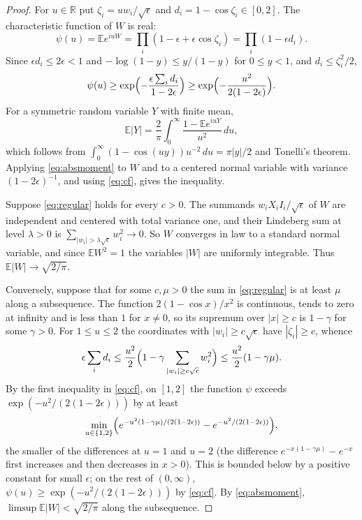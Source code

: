 \documentclass[11pt]{amsart}
\theoremstyle{remark}
\numberwithin{equation}{section}
\newcommand{\EE}{\mathbb{E}}
\newcommand{\R}{\mathbb{R}}
\begin{document}
\begin{proof}
For $u\in\R$ put $\zeta_i=uw_i/\sqrt\epsilon$ and $d_i=1-\cos \zeta_i\in[0,2]$. The characteristic function of $W$ is real:
\[
\psi(u)=\EE e^{iuW}=\prod_i(1-\epsilon+\epsilon\cos \zeta_i)=\prod_i(1-\epsilon d_i).
\]
Since $\epsilon d_i\le2\epsilon<1$ and $-\log(1-y)\le y/(1-y)$ for $0\le y<1$, and $d_i\le \zeta_i^2/2$,
\begin{equation}\label{eq:cf}
\psi(u)\ge\exp\Bigl(-\frac{\epsilon\sum_id_i}{1-2\epsilon}\Bigr)\ge\exp\Bigl(-\frac{u^2}{2(1-2\epsilon)}\Bigr).
\end{equation}
For a symmetric random variable $Y$ with finite mean,
\begin{equation}\label{eq:absmoment}
\EE|Y|=\frac2\pi\int_0^\infty\frac{1-\EE e^{iuY}}{u^2}\,du,
\end{equation}
which follows from $\int_0^\infty(1-\cos(uy))u^{-2}\,du=\pi|y|/2$ and Tonelli's theorem. Applying \eqref{eq:absmoment} to $W$ and to a centered normal variable with variance $(1-2\epsilon)^{-1}$, and using \eqref{eq:cf}, gives the inequality.

Suppose \eqref{eq:regular} holds for every $c>0$. The summands $w_iX_iI_i/\sqrt\epsilon$ of $W$ are independent and centered with total variance one, and their Lindeberg sum at level $\lambda>0$ is $\sum_{|w_i|>\lambda\sqrt\epsilon}w_i^2\to0$. So $W$ converges in law to a standard normal variable, and since $\EE W^2=1$ the variables $|W|$ are uniformly integrable. Thus $\EE|W|\to\sqrt{2/\pi}$.

Conversely, suppose that for some $c,\mu>0$ the sum in \eqref{eq:regular} is at least $\mu$ along a subsequence. The function $2(1-\cos x)/x^2$ is continuous, tends to zero at infinity and is less than $1$ for $x\ne0$, so its supremum over $|x|\ge c$ is $1-\gamma$ for some $\gamma>0$. For $1\le u\le2$ the coordinates with $|w_i|\ge c\sqrt\epsilon$ have $|\zeta_i|\ge c$, whence
\[
\epsilon\sum_id_i\le\frac{u^2}2\Bigl(1-\gamma\sum_{|w_i|\ge c\sqrt\epsilon}w_i^2\Bigr)\le\frac{u^2}{2}(1-\gamma\mu).
\]
By the first inequality in \eqref{eq:cf}, on $[1,2]$ the function $\psi$ exceeds $\exp(-u^2/(2(1-2\epsilon)))$ by at least
\[
\min_{u\in\{1,2\}}\Bigl(e^{-u^2(1-\gamma\mu)/(2(1-2\epsilon))}-e^{-u^2/(2(1-2\epsilon))}\Bigr),
\]
the smaller of the differences at $u=1$ and $u=2$ (the difference $e^{-x(1-\gamma\mu)}-e^{-x}$ first increases and then decreases in $x>0$). This is bounded below by a positive constant for small $\epsilon$; on the rest of $(0,\infty)$, $\psi(u)\ge\exp(-u^2/(2(1-2\epsilon)))$ by \eqref{eq:cf}. By \eqref{eq:absmoment}, $\limsup\EE|W|<\sqrt{2/\pi}$ along the subsequence.
\end{proof}
\end{document}
